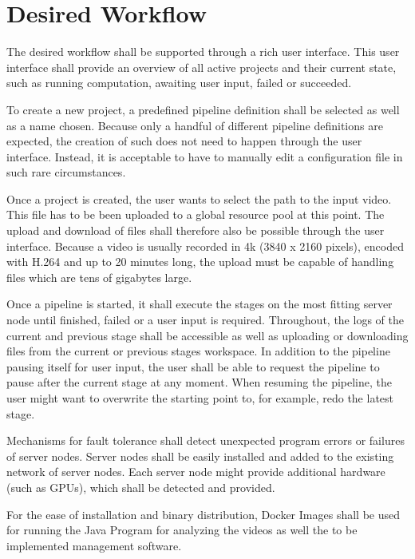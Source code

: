 \section{Desired Workflow}
\label{workflow}

The desired workflow shall be supported through a rich user interface.
This user interface shall provide an overview of all active projects and their current state, such as running computation, awaiting user input, failed or succeeded.

To create a new project, a predefined pipeline definition shall be selected as well as a name chosen.
Because only a handful of different pipeline definitions are expected, the creation of such does not need to happen through the user interface.
Instead, it is acceptable to have to manually edit a configuration file in such rare circumstances.

Once a project is created, the user wants to select the path to the input video.
This file has to be been uploaded to a global resource pool at this point.
The upload and download of files shall therefore also be possible through the user interface.
Because a video is usually recorded in 4k (3840 x 2160 pixels), encoded with H.264 and up to 20 minutes long, the upload must be capable of handling files which are tens of gigabytes large.

Once a pipeline is started, it shall execute the stages on the most fitting server node until finished, failed or a user input is required.
Throughout, the logs of the current and previous stage shall be accessible as well as uploading or downloading files from the current or previous stages workspace.
In addition to the pipeline pausing itself for user input, the user shall be able to request the pipeline to pause after the current stage at any moment.
When resuming the pipeline, the user might want to overwrite the starting point to, for example, redo the latest stage.

Mechanisms for fault tolerance shall detect unexpected program errors or failures of server nodes.
Server nodes shall be easily installed and added to the existing network of server nodes.
Each server node might provide additional hardware (such as GPUs), which shall be detected and provided.

For the ease of installation and binary distribution, Docker Images shall be used for running the Java Program for analyzing the videos as well the to be implemented management software.




